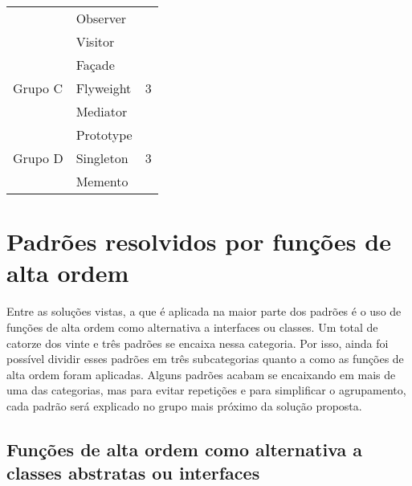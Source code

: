 \begin{quadro}[htb]
\begin{tabular}{@{}llll@{}}
        \multicolumn{2}{l}{}                                   & Observer                &                    \\
        \multicolumn{2}{l}{}                                   & Visitor                 &                    \\ \cmidrule(r){1-4}
        \multicolumn{2}{l}{\multirow{3}{*}{Grupo C}}           & Façade                  & \multirow{3}{*}{3} \\
        \multicolumn{2}{l}{}                                   & Flyweight               &                    \\
        \multicolumn{2}{l}{}                                   & Mediator                &                    \\ \cmidrule(r){1-4}
        \multicolumn{2}{l}{\multirow{3}{*}{Grupo D}}           & Prototype               & \multirow{3}{*}{3} \\ 
        \multicolumn{2}{l}{}                                   & Singleton               &                    \\
        \multicolumn{2}{l}{}                                   & Memento                 &                    \\ \cmidrule(r){1-4} %
    \end{tabular}
\end{quadro}

\section{Padrões resolvidos por funções de alta ordem}

Entre as soluções vistas, a que é aplicada na 
maior parte dos padrões é o uso de funções de alta 
ordem como alternativa a interfaces ou classes. 
Um total de catorze dos vinte e três padrões 
se encaixa nessa categoria. Por isso, ainda foi 
possível dividir esses padrões em três  
subcategorias quanto a como as funções de alta 
ordem foram aplicadas. Alguns padrões acabam se 
encaixando em mais de uma das categorias, mas para 
evitar repetições e para simplificar o agrupamento, 
cada padrão será explicado no grupo mais próximo 
da solução proposta. 

\subsection{Funções de alta ordem como alternativa a 
            classes abstratas ou interfaces}

